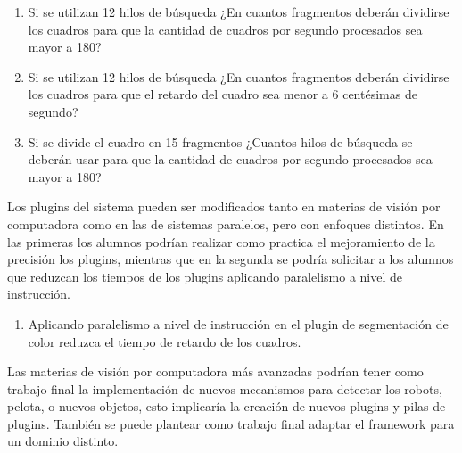 \begin{enumerate}
{\begin{enumerate}

	\item{Si se utilizan 12 hilos de búsqueda ¿En cuantos fragmentos deberán
		dividirse los cuadros para que la cantidad de cuadros por
		segundo procesados sea mayor a 180?}

	\item{Si se utilizan 12 hilos de búsqueda ¿En cuantos fragmentos deberán
		dividirse los cuadros para que el retardo del cuadro sea menor a
		6 centésimas de segundo?}

	\item{Si se divide el cuadro en 15 fragmentos ¿Cuantos hilos de búsqueda
		se deberán usar para que la cantidad de cuadros por segundo
		procesados sea mayor a 180?}

\end{enumerate}}

\end{enumerate}

Los plugins del sistema pueden ser modificados tanto en materias de visión por
computadora como en las de sistemas paralelos, pero con enfoques distintos. En
las primeras los alumnos podrían realizar como practica el mejoramiento de la
precisión los plugins, mientras que en la segunda se podría solicitar a los
alumnos que reduzcan los tiempos de los plugins aplicando paralelismo a nivel de
instrucción.

\begin{enumerate}

	\item{Aplicando paralelismo a nivel de instrucción en el plugin de
		segmentación de color reduzca el tiempo de retardo de los
		cuadros.}

\end{enumerate}

Las materias de visión por computadora más avanzadas podrían tener como trabajo
final la implementación de nuevos mecanismos para detectar los robots, pelota, o
nuevos objetos, esto implicaría la creación de nuevos plugins y pilas de
plugins. También se puede plantear como trabajo final adaptar el framework para
un dominio distinto.

